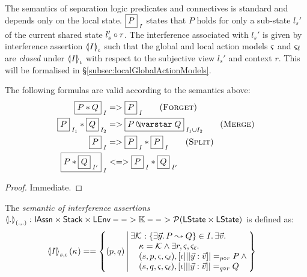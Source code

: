 
The semantics of separation logic predicates and connectives is
standard and depends only on the local state.  $\shared{P}{I}$ states
that $P$ holds for only a sub-state $l_s'$ of the current shared state
$l_s'\composeL r$. The interference associated with $l_s'$ is given by
interference assertion $\semI[\lenv]{I}$ such that the global and
local action models $\amod{}$ and $\amod{\ell}$ are \emph{closed}
under $\semI[\lenv]{I}$ with respect to the subjective view $l_s'$ and
context $r$. This will be formalised in \S\ref{subsec:localGlobalActionModels}.

\begin{lemma}
  \label{lem:assertionFacts}
  The following formulas are valid according to the semantics above:
  \begin{align*}
  \shared{P * Q}{I} &=> \shared{P}{I}  \tag{\textsc{Forget}}\\
  \shared{P}{I_1} * \shared{Q}{I_2} &=> \shared{P \sepish Q}{I_1 \cup I_2} \tag{\textsc{Merge}}\\
  \shared{P}{I} &=> \shared{P}{I} * \shared P I \tag{\textsc{Split}}\\
  \shared{P * \shared{Q}{I'}}{I} &<=> \shared{P}{I} * \shared{Q}{I'}
  \end{align*}
\end{lemma}
\begin{proof}
  Immediate.
\end{proof}

\begin{definition}
  \label{def:interferenceSemantics}
  The \emph{semantic of interference assertions}
  $
  \semI[(.,.)]{.} : \IAssertions \times \set{Stack}\times\LEnv -->
  \Caps -->  \powerset(\LStates \times \LStates)
  $
  is defined as:
  \begin{align*}
  \semI[s,\lenv]{I}(\ca{}) &==
  \left\{
  \begin{array}{@{}l@{\ }|@{\ }r@{}}
    (p, q)&
    \begin{array}{@{}l@{}}
      \exsts{\interAss{\capAss{}}{\vec{y}}{P}{Q} \in I} \exsts{\vec{v}}\null\\
      \quad\ca{} = \capAss{} \land\exsts{r, \amod{}, \amod{\ell}}\\
      \quad (s,p,\amod{}, \amod{\ell}),[\lenv|||\vec y:\vec v] |=_{p \composeL r} P \land\null\\
      \quad (s,q,\amod{}, \amod{\ell}),[\lenv|||\vec y:\vec v] |=_{q \composeL r} Q
    \end{array}
  \end{array}
  \right\}
  \end{align*}
\end{definition}



